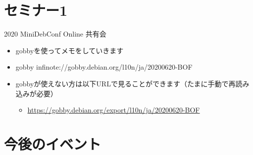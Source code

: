 {\footnotesize
 
}

%

\section{セミナー1}

\begin{frame}{2020 MiniDebConf Online 共有会}
  \begin{itemize}
  \item gobbyを使ってメモをしていきます
  \item gobby infinote://gobby.debian.org/l10n/ja/20200620-BOF
  \item gobbyが使えない方は以下URLで見ることができます（たまに手動で再読み込みが必要）
    \begin{itemize}
    \item \url{https://gobby.debian.org/export/l10n/ja/20200620-BOF}
    \end{itemize}
  \end{itemize}
\end{frame}



\section{今後のイベント}

